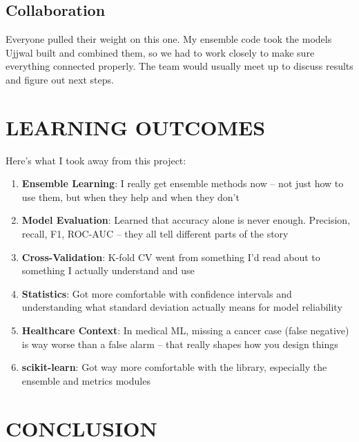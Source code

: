 \documentclass[12pt]{article}
\begin{document}
\subsection{Collaboration}
Everyone pulled their weight on this one. My ensemble code took the models Ujjwal built and combined them, so we had to work closely to make sure everything connected properly. The team would usually meet up to discuss results and figure out next steps.

\newpage
\section{LEARNING OUTCOMES}

Here's what I took away from this project:

\begin{enumerate}
    \item \textbf{Ensemble Learning}: I really get ensemble methods now -- not just how to use them, but when they help and when they don't
    
    \item \textbf{Model Evaluation}: Learned that accuracy alone is never enough. Precision, recall, F1, ROC-AUC -- they all tell different parts of the story
    
    \item \textbf{Cross-Validation}: K-fold CV went from something I'd read about to something I actually understand and use
    
    \item \textbf{Statistics}: Got more comfortable with confidence intervals and understanding what standard deviation actually means for model reliability
    
    \item \textbf{Healthcare Context}: In medical ML, missing a cancer case (false negative) is way worse than a false alarm -- that really shapes how you design things
    
    \item \textbf{scikit-learn}: Got way more comfortable with the library, especially the ensemble and metrics modules
\end{enumerate}

\newpage
\section{CONCLUSION}
\end{document}
